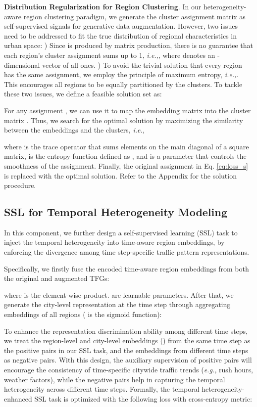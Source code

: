 \documentclass[letterpaper]{article} \usepackage{aaai23}  \usepackage{times}  \usepackage{helvet}  \usepackage{courier}  \usepackage[hyphens]{url}  \usepackage{graphicx} \urlstyle{rm} \def\UrlFont{\rm}  \usepackage{natbib}  \usepackage{caption} \frenchspacing  \setlength{\pdfpagewidth}{8.5in} \setlength{\pdfpageheight}{11in}
\newcommand{\ie}{\emph{i.e.,}\xspace}
\newcommand{\eg}{\emph{e.g.,}\xspace}
\begin{document}
\noindent \textbf{Distribution Regularization for Region Clustering}.
In our heterogeneity-aware region clustering paradigm, we generate the cluster assignment matrix  as self-supervised signals for generative data augmentation. However, two issues need to be addressed to fit the true distribution of regional characteristics in urban space: ) Since  is produced by matrix production, there is no guarantee that each region's cluster assignment sums up to 1, \ie , where  denotes an -dimensional vector of all ones. ) To avoid the trivial solution that every region has the same assignment, we employ the principle of maximum entropy, \ie . This encourages all regions to be equally partitioned by the clusters. To tackle these two issues, we define a feasible solution set as:




For any assignment , we can use it to map the embedding matrix  into the cluster matrix . Thus, we search for the optimal solution by maximizing the similarity between the embeddings and the clusters, \ie 

where  is the trace operator that sums elements on the main diagonal of a square matrix,  is the entropy function defined as , and  is a parameter that controls the smoothness of the assignment. Finally, the original assignment in Eq. \eqref{eq:loss_s} is replaced with the optimal solution. Refer to the Appendix for the solution procedure.

\subsection{SSL for Temporal Heterogeneity Modeling}



In this component, we further design a self-supervised learning (SSL) task to inject the temporal heterogeneity into time-aware region embeddings, by enforcing the divergence among time step-specific traffic pattern representations. 


Specifically, we firstly fuse the encoded time-aware region embeddings from both the original and augmented TFGs:

\noindent where  is the element-wise product.  are learnable parameters. After that, we generate the city-level representation  at the time step  through aggregating embeddings of all regions ( is the sigmoid function):




To enhance the representation discrimination ability among different time steps, we treat the region-level and city-level embeddings () from the same time step as the positive pairs in our SSL task, and the embeddings from different time steps as negative pairs. With this design, the auxiliary supervision of positive pairs will encourage the consistency of time-specific citywide traffic trends (\eg rush hours, weather factors), while the negative pairs help in capturing the temporal heterogeneity across different time steps. Formally, the temporal heterogeneity-enhanced SSL task is optimized with the following loss with cross-entropy metric:
\end{document}
